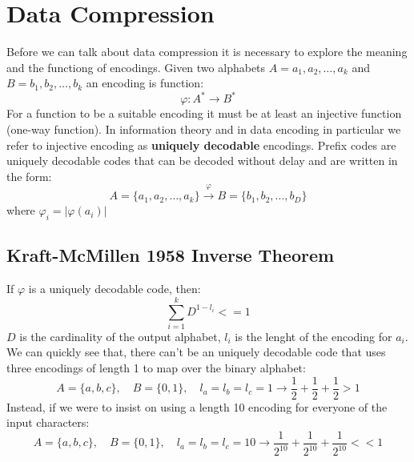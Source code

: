 \section{Data Compression}
Before we can talk about data compression it is necessary to explore the meaning and the functiong of encodings. Given two alphabets $A={a_1,a_2,\ldots,a_k}$ and $B={b_1,b_2,\ldots,b_k}$ an encoding is function:
\begin{equation}
    \varphi: A^* \longrightarrow B^*
\end{equation}
For a function to be a suitable encoding it must be at least an injective function (one-way function). In information theory and in data encoding in particular we refer to injective encoding as \textbf{uniquely decodable} encodings.
Prefix codes are uniquely decodable codes that can be decoded without delay and are written in the form:
\begin{equation}
    A=\{a_1, a_2, \ldots, a_k\} \xrightarrow{\varphi} B=\{b_1, b_2, \ldots, b_D\}
\end{equation}
where $\varphi_i = |\varphi(a_i)|$
    \subsection{Kraft-McMillen 1958 Inverse Theorem}
    If $\varphi$ is a uniquely decodable code, then:
    \begin{equation}
        \sum_{i=1}^{k}{D^{1-l_i}}<=1
    \end{equation}
    $D$ is the cardinality of the output alphabet, $l_i$ is the lenght of the encoding for $a_i$. We can quickly see that, there can't be an uniquely decodable code that uses three encodings of length 1 to map over the binary alphabet:
    \begin{equation}
        A=\{a,b,c\},\quad B=\{0,1\}, \quad
        l_a=l_b=l_c=1 \longrightarrow \frac{1}{2}+\frac{1}{2}+\frac{1}{2} >1
    \end{equation}
    Instead, if we were to insist on using a length 10 encoding for everyone of the input characters:
    \begin{equation}
        A=\{a,b,c\},\quad B=\{0,1\},\quad
        l_a=l_b=l_c=10 \longrightarrow \frac{1}{2^{10}}+\frac{1}{2^{10}}+\frac{1}{2^{10}} << 1
    \end{equation}
